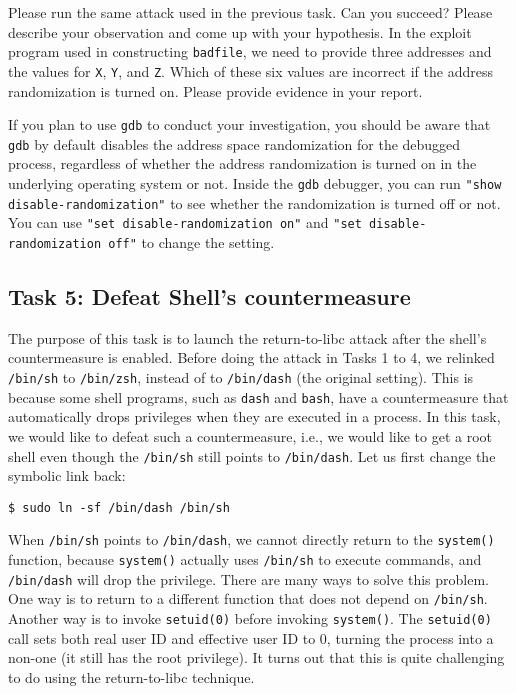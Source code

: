 Please run the same attack used in the previous task. Can you succeed? 
Please describe your observation and come up with your hypothesis. 
In the exploit program used in constructing \texttt{badfile}, we
need to provide three addresses and the values for \texttt{X}, \texttt{Y},
and \texttt{Z}. Which of these six values are incorrect if 
the address randomization is turned on. Please provide evidence in your
report. 


If you plan to use \texttt{gdb} to conduct your investigation, you should
be aware that \texttt{gdb} by default disables the address space randomization for the
debugged process, regardless of whether the address randomization is 
turned on in the underlying operating system or not. Inside the
\texttt{gdb} debugger, you can run \texttt{"show disable-randomization"} 
to see whether the randomization is turned off or not.
You can use \texttt{"set disable-randomization on"} and
\texttt{"set disable-randomization off"} to change the setting. 



\subsection{Task 5: Defeat Shell's countermeasure}

The purpose of this task is to launch the return-to-libc attack after 
the shell's countermeasure is enabled. 
Before doing the attack in Tasks 1 to 4, we relinked \texttt{/bin/sh} to \texttt{/bin/zsh},
instead of to \texttt{/bin/dash} (the original setting). This is because some shell programs, such 
as \texttt{dash} and \texttt{bash}, have a countermeasure that automatically 
drops privileges when they are executed in a \setuid process. In this task, we 
would like to defeat such a countermeasure, i.e., we would like to get a root shell even though
the \texttt{/bin/sh} still points to \texttt{/bin/dash}.   
Let us first change the symbolic link back:

\begin{lstlisting}
$ sudo ln -sf /bin/dash /bin/sh
\end{lstlisting}


When \texttt{/bin/sh} points to \texttt{/bin/dash}, we cannot directly return 
to the \texttt{system()} function, because \texttt{system()} actually uses 
\texttt{/bin/sh} to execute commands, and \texttt{/bin/dash} will 
drop the privilege. There are many ways to solve this problem. One way 
is to return to a different function that does not depend on \texttt{/bin/sh}. 
Another way is to invoke \texttt{setuid(0)} before 
invoking \texttt{system()}. The \texttt{setuid(0)} call sets both real user ID and  
effective user ID to 0, turning the process into a non-\setuid one (it still has 
the root privilege). It turns out that this is quite challenging to do 
using the return-to-libc technique. 


